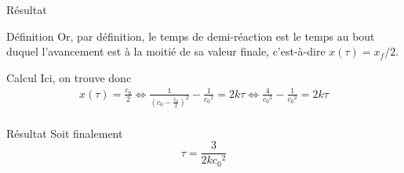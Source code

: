 \documentclass[a4paper, 12pt, final, garamond]{book}
\begin{document}
\begin{enumerate}
\begin{rprop}{Résultat}
        \end{rprop}
        \begin{rdefi}{Définition}
            Or, par définition, le temps de demi-réaction est le temps au bout
            duquel l'avancement est à la moitié de sa valeur finale,
            c'est-à-dire $x(\tau) = x_f/2$.
        \end{rdefi}
        \begin{rexem}{Calcul}
            Ici, on trouve donc
            \begin{gather*}
                x(\tau) = \frac{c_0}{2}
                \Leftrightarrow
                \frac{1}{(c_0 - \frac{c_0}{2})^2} - \frac{1}{c_0{}^2} = 2k\tau
                \Leftrightarrow
                \frac{4}{c_0{}^2} - \frac{1}{c_0{}^2} = 2k\tau\\
            \end{gather*}
        \end{rexem}
        \begin{rprop}{Résultat}
            Soit finalement
            \[\boxed{\tau = \frac{3}{2kc_0{}^2}}\]
        \end{rprop}
\end{enumerate}
\end{document}
